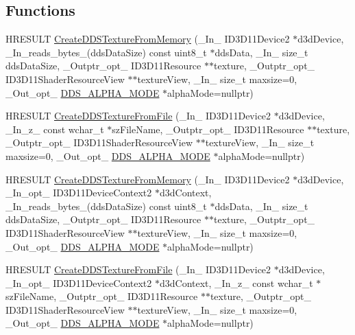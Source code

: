 \subsection*{Functions}
\begin{DoxyCompactItemize}
\item 
H\+R\+E\+S\+U\+LT \hyperlink{namespace_direct_x_a8e8f1eb30ffa72466429e061d33ba87c}{Create\+D\+D\+S\+Texture\+From\+Memory} (\+\_\+\+In\+\_\+ I\+D3\+D11\+Device2 $\ast$d3d\+Device, \+\_\+\+In\+\_\+reads\+\_\+bytes\+\_\+(dds\+Data\+Size) const uint8\+\_\+t $\ast$dds\+Data, \+\_\+\+In\+\_\+ size\+\_\+t dds\+Data\+Size, \+\_\+\+Outptr\+\_\+opt\+\_\+ I\+D3\+D11\+Resource $\ast$$\ast$texture, \+\_\+\+Outptr\+\_\+opt\+\_\+ I\+D3\+D11\+Shader\+Resource\+View $\ast$$\ast$texture\+View, \+\_\+\+In\+\_\+ size\+\_\+t maxsize=0, \+\_\+\+Out\+\_\+opt\+\_\+ \hyperlink{namespace_direct_x_a7cb48689d75471680c0bf7f79caaaf1f}{D\+D\+S\+\_\+\+A\+L\+P\+H\+A\+\_\+\+M\+O\+DE} $\ast$alpha\+Mode=nullptr)
\item 
H\+R\+E\+S\+U\+LT \hyperlink{namespace_direct_x_ac646adaccac517f0358eebabfbfd5ec2}{Create\+D\+D\+S\+Texture\+From\+File} (\+\_\+\+In\+\_\+ I\+D3\+D11\+Device2 $\ast$d3d\+Device, \+\_\+\+In\+\_\+z\+\_\+ const wchar\+\_\+t $\ast$sz\+File\+Name, \+\_\+\+Outptr\+\_\+opt\+\_\+ I\+D3\+D11\+Resource $\ast$$\ast$texture, \+\_\+\+Outptr\+\_\+opt\+\_\+ I\+D3\+D11\+Shader\+Resource\+View $\ast$$\ast$texture\+View, \+\_\+\+In\+\_\+ size\+\_\+t maxsize=0, \+\_\+\+Out\+\_\+opt\+\_\+ \hyperlink{namespace_direct_x_a7cb48689d75471680c0bf7f79caaaf1f}{D\+D\+S\+\_\+\+A\+L\+P\+H\+A\+\_\+\+M\+O\+DE} $\ast$alpha\+Mode=nullptr)
\item 
H\+R\+E\+S\+U\+LT \hyperlink{namespace_direct_x_ad771674c7d53dec69909c454c068fef1}{Create\+D\+D\+S\+Texture\+From\+Memory} (\+\_\+\+In\+\_\+ I\+D3\+D11\+Device2 $\ast$d3d\+Device, \+\_\+\+In\+\_\+opt\+\_\+ I\+D3\+D11\+Device\+Context2 $\ast$d3d\+Context, \+\_\+\+In\+\_\+reads\+\_\+bytes\+\_\+(dds\+Data\+Size) const uint8\+\_\+t $\ast$dds\+Data, \+\_\+\+In\+\_\+ size\+\_\+t dds\+Data\+Size, \+\_\+\+Outptr\+\_\+opt\+\_\+ I\+D3\+D11\+Resource $\ast$$\ast$texture, \+\_\+\+Outptr\+\_\+opt\+\_\+ I\+D3\+D11\+Shader\+Resource\+View $\ast$$\ast$texture\+View, \+\_\+\+In\+\_\+ size\+\_\+t maxsize=0, \+\_\+\+Out\+\_\+opt\+\_\+ \hyperlink{namespace_direct_x_a7cb48689d75471680c0bf7f79caaaf1f}{D\+D\+S\+\_\+\+A\+L\+P\+H\+A\+\_\+\+M\+O\+DE} $\ast$alpha\+Mode=nullptr)
\item 
H\+R\+E\+S\+U\+LT \hyperlink{namespace_direct_x_a60e0d59f6f38e04351af7861eaac33df}{Create\+D\+D\+S\+Texture\+From\+File} (\+\_\+\+In\+\_\+ I\+D3\+D11\+Device2 $\ast$d3d\+Device, \+\_\+\+In\+\_\+opt\+\_\+ I\+D3\+D11\+Device\+Context2 $\ast$d3d\+Context, \+\_\+\+In\+\_\+z\+\_\+ const wchar\+\_\+t $\ast$sz\+File\+Name, \+\_\+\+Outptr\+\_\+opt\+\_\+ I\+D3\+D11\+Resource $\ast$$\ast$texture, \+\_\+\+Outptr\+\_\+opt\+\_\+ I\+D3\+D11\+Shader\+Resource\+View $\ast$$\ast$texture\+View, \+\_\+\+In\+\_\+ size\+\_\+t maxsize=0, \+\_\+\+Out\+\_\+opt\+\_\+ \hyperlink{namespace_direct_x_a7cb48689d75471680c0bf7f79caaaf1f}{D\+D\+S\+\_\+\+A\+L\+P\+H\+A\+\_\+\+M\+O\+DE} $\ast$alpha\+Mode=nullptr)

\end{DoxyCompactItemize}
